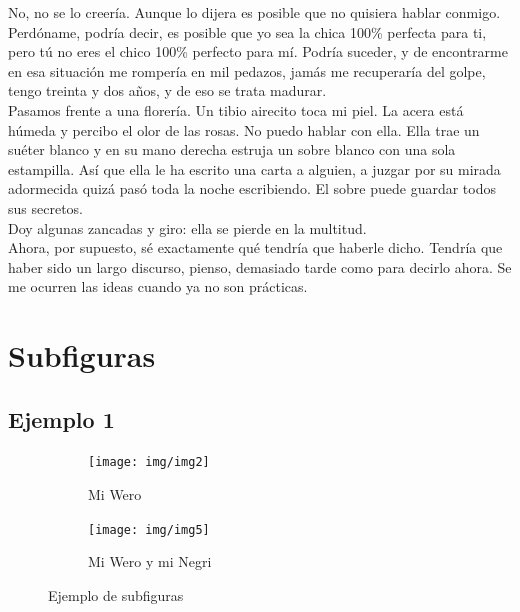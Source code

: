 \documentclass[letterpaper]{article}
\begin{document}
	No, no se lo creería. Aunque lo dijera es posible que no quisiera hablar conmigo. Perdóname, podría decir, es posible que yo sea la chica 100\% perfecta para ti, pero tú no eres el chico 100\% perfecto para mí. Podría suceder, y de encontrarme en esa situación me rompería en mil pedazos, jamás me recuperaría del golpe, tengo treinta y dos años, y de eso se trata madurar. \\

Pasamos frente a una florería. Un tibio airecito toca mi piel. La acera está húmeda y percibo el olor de las rosas. No puedo hablar con ella. Ella trae un suéter blanco y en su mano derecha estruja un sobre blanco con una sola estampilla. Así que ella le ha escrito una carta a alguien, a juzgar por su mirada adormecida quizá pasó toda la noche escribiendo. El sobre puede guardar todos sus secretos. \\

Doy algunas zancadas y giro: ella se pierde en la multitud. \\

Ahora, por supuesto, sé exactamente qué tendría que haberle dicho. Tendría que haber sido un largo discurso, pienso, demasiado tarde como para decirlo ahora. Se me ocurren las ideas cuando ya no son prácticas. \\


	\section{Subfiguras}
	\subsection{Ejemplo 1}
	
	\begin{figure}[h]
		\centering
		\begin{subfigure}{6cm}
			\texttt{[image: img/img2]}
			\caption{Mi Wero}
		\end{subfigure}
		\begin{subfigure}{6cm}
			\texttt{[image: img/img5]}
			\caption{Mi Wero y mi Negri}
		\end{subfigure}
		\caption{Ejemplo de subfiguras}
	\end{figure}


	
\end{document}
